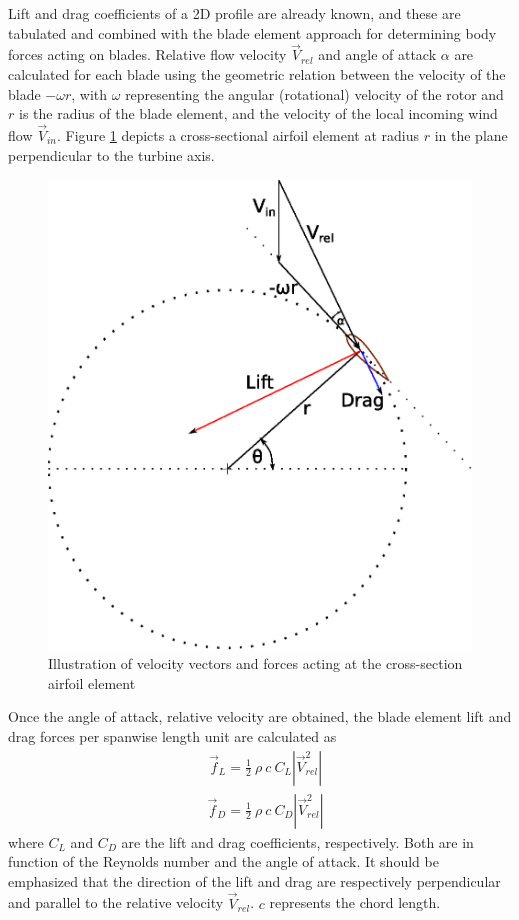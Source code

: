 \documentclass[a4paper]{jpconf}
\begin{document}
Lift and drag coefficients of a 2D profile are already known, and these are tabulated and combined with the blade element approach for determining 
body forces acting on blades. Relative flow velocity $\vec{V}_{rel} $ and angle of attack $\alpha$ are calculated for each blade using the geometric relation between the velocity of the blade $- \omega r$, with $\omega$ representing the angular (rotational) velocity of the rotor and $r$ is the radius of the blade element, and the velocity of the local incoming wind flow $\vec{V}_{in}$. Figure \ref{figvectors} depicts a cross-sectional airfoil element at radius $r$ in the plane perpendicular to the turbine axis.   

\begin{figure}[h]
\begin{center}
\includegraphics[width=0.35\columnwidth]{vector.eps}
\end{center}
\caption{\label{figvectors} Illustration of velocity vectors and forces acting at the cross-section airfoil element}
\end{figure}

Once the angle of attack, relative velocity are obtained, the blade element lift and drag forces per spanwise length unit are calculated as
\begin{align}
& \vec{f}_L = \frac{1}{2} \ \rho \ c \ C_L \left| \vec{V}_{rel}^2 \right|  \label{lift}  
\end{align} %
\begin{align}
& \vec{f}_D = \frac{1}{2} \ \rho \ c \ C_D \left| \vec{V}_{rel}^2 \right|  \label{drag}  
\end{align} %
where $C_L$ and $C_D$ are the lift and drag coefficients, respectively. Both are in function of the Reynolds number and the angle of attack. It should be emphasized that the direction of the lift and drag are respectively perpendicular and parallel to the relative velocity $\vec{V}_{rel}$. $c$ represents the chord length.
\end{document}
